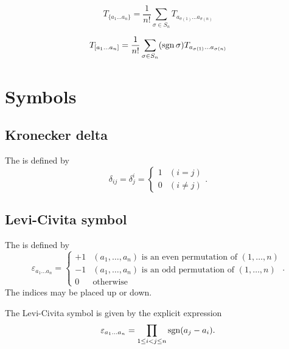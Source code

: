 \[ T_{\{a_1\dots a_n\}} = \frac{1}{n!} \sum_{\sigma\in S_n} T_{a_{\sigma(1)} \dots a_{\sigma(n)}} \]

\[ T_{[a_1\dots a_n]} = \frac{1}{n!} \sum_{\sigma\in S_n} (\operatorname{sgn} \sigma)T_{a_{\sigma(1)} \dots a_{\sigma(n)}} \]
\section{Symbols}
\subsection{Kronecker delta}
\begin{definition}
The  is defined by
\[ \delta_{ij} = \delta^i_j = \begin{cases}
1 & (i=j) \\
0 & (i \neq j)
\end{cases}.\]
\end{definition}
\subsection{Levi-Civita symbol}
\begin{definition}
The  is defined by
\[ \varepsilon_{a_{1}\ldots a_{n}} = \begin{cases}
+1 & \text{$(a_{1},\ldots, a_{n})$ is an even permutation of $(1,\ldots, n)$} \\
-1 & \text{$(a_{1},\ldots, a_{n})$ is an odd permutation of $(1,\ldots, n)$} \\
0 & \text{otherwise}
\end{cases}.\]
The indices may be placed up or down.
\end{definition}

\begin{lemma} \label{LeviCivitaProduct}
The Levi-Civita symbol is given by the explicit expression
\[ \varepsilon_{a_{1}\ldots a_{n}} = \prod_{1\leq i<j\leq n}\operatorname{sgn}(a_j-a_i).\]
\end{lemma}

